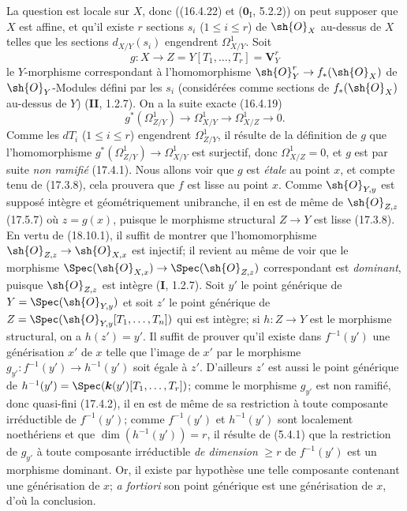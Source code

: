 La question est locale sur $X$, donc ((16.4.22) et ($\mathbf{0}_{\mathrm I}$, 5.2.2)) on peut supposer que $X$ est affine, et qu'il existe $r$ sections $s_i$ ($1\leq i\leq r$) de $\sh{O}_X$ au-dessus de $X$ telles que les sections $d_{X/Y}(s_i)$ engendrent $\varOmega^1_{X/Y}$. Soit
\[
  g:X\to Z=Y[T_1,\ldots,T_r]=\mathbf V^r_Y
\]
le $Y$-morphisme correspondant à l'homomorphisme $\sh{O}_Y^r\to f_*(\sh{O}_X)$ de $\sh{O}_Y$-Modules défini par les $s_i$ (considérées comme sections de $f_*(\sh{O}_X)$ au-dessus de $Y$) (\textbf{II}, 1.2.7). On a la suite exacte (16.4.19)
\[
  g^*(\varOmega^1_{Z/Y})\longrightarrow\varOmega^1_{X/Y}\longrightarrow\varOmega^1_{X/Z}\longrightarrow0.
\]
Comme les $dT_i$ ($1\leq i\leq r$) engendrent $\varOmega^1_{Z/Y}$, il résulte de la définition de $g$ que l'homomorphisme $g^*(\varOmega^1_{Z/Y})\to\varOmega^1_{X/Y}$ est surjectif, donc $\varOmega^1_{X/Z}=0$, et $g$ est par suite \emph{non ramifié} (17.4.1). Nous allons voir que $g$ est \emph{étale} au point $x$, et compte tenu de (17.3.8), cela prouvera que $f$ est lisse au point $x$. Comme $\sh{O}_{Y,y}$ est supposé intègre et géométriquement
unibranche, il en est de même de $\sh{O}_{Z,z}$ (17.5.7) où $z=g(x)$, puisque le morphisme structural $Z\to Y$ est lisse (17.3.8). En vertu de (18.10.1), il suffit de montrer que l'homomorphisme $\sh{O}_{Z,z}\to\sh{O}_{X,x}$ est injectif; il revient au même de voir que le morphisme $\Spec(\sh{O}_{X,x})\to\Spec(\sh{O}_{Z,z})$ correspondant est \emph{dominant}, puisque $\sh{O}_{Z,z}$ est intègre (\textbf{I}, 1.2.7).
Soit $y'$ le point générique de $Y=\Spec(\sh{O}_{Y,y})$ et soit $z'$ le point générique de $Z=\Spec(\sh{O}_{Y,y}[T_1,\ldots,T_n])$ qui est intègre; si $h:Z\to Y$ est le morphisme structural, on a $h(z')=y'$. Il suffit de prouver qu'il existe dans $f^{-1}(y')$ une générisation $x'$ de $x$ telle que l'image de $x'$ par le morphisme $g_{y'}:f^{-1}(y')\to h^{-1}(y')$ soit égale à $z'$. D'ailleurs $z'$ est aussi le point générique de $h^{-1}(y')=\Spec(\boldsymbol{k}(y')[T_1,\ldots,T_r])$; comme le morphisme $g_{y'}$ est non ramifié, donc quasi-fini (17.4.2), il en est de même de sa restriction à toute composante irréductible de $f^{-1}(y')$; comme $f^{-1}(y')$ et $h^{-1}(y')$ sont localement noethériens et que $\dim(h^{-1}(y'))=r$, il résulte de (5.4.1) que la restriction de $g_{y'}$ à toute composante irréductible \emph{de dimension} $\geq r$ de $f^{-1}(y')$ est un morphisme dominant. Or, il existe par hypothèse une telle composante contenant une générisation de $x$; \emph{a fortiori} son point générique est une générisation de $x$, d'où la conclusion.


